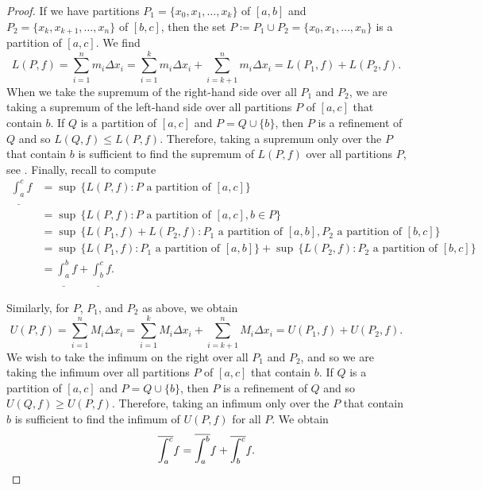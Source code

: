 \begin{proof}
If we have partitions $P_1 = \{ x_0,x_1,\ldots,x_k \}$
of $[a,b]$ and $P_2 = \{ x_k, x_{k+1}, \ldots, x_n \}$ of $[b,c]$,
then the set $P \coloneqq P_1 \cup P_2 = \{ x_0, x_1, \ldots, x_n \}$ is
a partition of $[a,c]$.  We find
\begin{equation*}
L(P,f) =
\sum_{i=1}^n m_i \Delta x_i
=
\sum_{i=1}^k m_i \Delta x_i
+
\sum_{i=k+1}^n m_i \Delta x_i
=
L(P_1,f) + L(P_2,f) .
\end{equation*}
When we take the supremum of the right-hand side over all $P_1$ and $P_2$,
we are taking a supremum of the left-hand side
over all partitions $P$ of $[a,c]$ that contain $b$.  If $Q$ is a partition
of $[a,c]$ and $P = Q \cup \{ b \}$, then $P$ is a refinement of $Q$
and so $L(Q,f) \leq L(P,f)$.  Therefore, taking a supremum only over the $P$
that contain $b$ is sufficient to find the supremum of $L(P,f)$
over all partitions $P$, see .
Finally, recall 
to compute
\begin{equation*}
\begin{split}
\underline{\int_a^c} f
& =
\sup \, \bigl\{ L(P,f) : P \text{ a partition of } [a,c] \bigr\}
\\
& =
\sup \, \bigl\{ L(P,f) : P \text{ a partition of } [a,c], b \in P \bigr\}
\\
& =
\sup \, \bigl\{ L(P_1,f) + L(P_2,f) :
P_1 \text{ a partition of } [a,b], P_2 \text{ a partition of } [b,c] \bigr\}
\\
& =
\sup \, \bigl\{ L(P_1,f) : P_1 \text{ a partition of } [a,b] \bigr\}
+
\sup \, \bigl\{ L(P_2,f) : P_2 \text{ a partition of } [b,c] \bigr\}
\\
&=
\underline{\int_a^b} f + \underline{\int_b^c} f .
\end{split}
\end{equation*}

Similarly, for $P$, $P_1$, and $P_2$ as above, we obtain
\begin{equation*}
U(P,f) =
\sum_{i=1}^n M_i \Delta x_i
=
\sum_{i=1}^k M_i \Delta x_i
+
\sum_{i=k+1}^n M_i \Delta x_i
=
U(P_1,f) + U(P_2,f) .
\end{equation*}
We wish to take the infimum on the right
over all $P_1$ and $P_2$, and so we are taking the infimum
over all partitions $P$ of $[a,c]$ that contain $b$.  If $Q$ is a partition
of $[a,c]$ and $P = Q \cup \{ b \}$, then $P$ is a refinement of $Q$
and so $U(Q,f) \geq U(P,f)$.  Therefore, taking an infimum only over the $P$
that contain $b$ is sufficient to find the infimum of $U(P,f)$ for
all $P$.
We obtain
\begin{equation*}
\overline{\int_a^c} f
=
\overline{\int_a^b} f + \overline{\int_b^c} f .  \qedhere
\end{equation*}
\end{proof}

